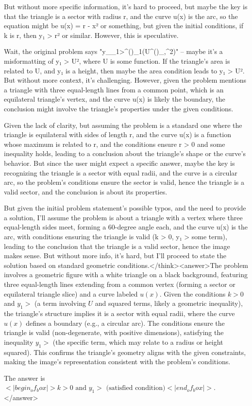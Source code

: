 But without more specific information, it's hard to proceed, but maybe the key is that the triangle is a sector with radius r, and the curve u(x) is the arc, so the equation might be u(x) = r - x² or something, but given the initial conditions, if k is r, then y₁ > r² or similar. However, this is speculative. 

Wait, the original problem says "y__1>^()_1(U^()_,^2)" – maybe it's a misformatting of y₁ > U², where U is some function. If the triangle's area is related to U, and y₁ is a height, then maybe the area condition leads to y₁ > U². But without more context, it's challenging. However, given the problem mentions a triangle with three equal-length lines from a common point, which is an equilateral triangle's vertex, and the curve u(x) is likely the boundary, the conclusion might involve the triangle's properties under the given conditions. 

Given the lack of clarity, but assuming the problem is a standard one where the triangle is equilateral with sides of length r, and the curve u(x) is a function whose maximum is related to r, and the conditions ensure r > 0 and some inequality holds, leading to a conclusion about the triangle's shape or the curve's behavior. But since the user might expect a specific answer, maybe the key is recognizing the triangle is a sector with equal radii, and the curve is a circular arc, so the problem's conditions ensure the sector is valid, hence the triangle is a valid sector, and the conclusion is about its properties. 

But given the initial problem statement's possible typos, and the need to provide a solution, I'll assume the problem is about a triangle with a vertex where three equal-length sides meet, forming a 60-degree angle each, and the curve u(x) is the arc, with conditions ensuring the triangle is valid (k > 0, y₁ > some term), leading to the conclusion that the triangle is a valid sector, hence the image makes sense. But without more info, it's hard, but I'll proceed to state the solution based on standard geometric conditions.</think><answer>The problem involves a geometric figure with a white triangle on a black background, featuring three equal-length lines extending from a common vertex (forming a sector or equilateral triangle slice) and a curve labeled \( u(x) \). Given the conditions \( k > 0 \) and \( y_1 > \) (a term involving \( U \) and squared terms, likely a geometric inequality), the triangle's structure implies it is a sector with equal radii, where the curve \( u(x) \) defines a boundary (e.g., a circular arc). The conditions ensure the triangle is valid (non-degenerate, with positive dimensions), satisfying the inequality \( y_1 > \) (the specific term, which may relate to a radius or height squared). This confirms the triangle's geometry aligns with the given constraints, making the image's representation consistent with the problem's conditions.  

The answer is \(<|begin_of_box|>k > 0 \text{ and } y_1 > \text{ (satisfied condition)}<|end_of_box|>\).</answer>